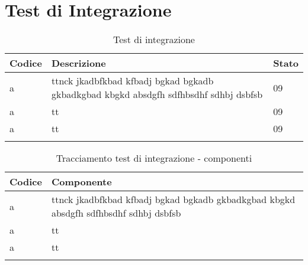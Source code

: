 \documentclass[PianoDiQualifica.tex]{subfiles}
\begin{document}
\chapter{Test di Integrazione}

\begin{longtable}[H]{P{2cm}P{8.5cm}P{3cm}}
	\color{CHeaderText}\textbf{Codice} & 
	\color{CHeaderText}\textbf{Descrizione} & 
	\color{CHeaderText}\textbf{Stato}\\
	\endhead
	a & ttnck  jkadbfkbad kfbadj bgkad bgkadb gkbadkgbad kbgkd absdgfh sdfhbsdhf sdhbj dsbfsb & 09 \\ 
	a & tt & 09 \\
	a & tt & 09 \\
	\hiderowcolors
	\caption{Test di integrazione}
\end{longtable}

\begin{longtable}[H]{P{2cm}P{11.5cm}}
	\color{CHeaderText}\textbf{Codice} & 
	\color{CHeaderText}\textbf{Componente} \\
	\endhead
	a & ttnck  jkadbfkbad kfbadj bgkad bgkadb gkbadkgbad kbgkd absdgfh sdfhbsdhf sdhbj dsbfsb \\ 
	a & tt  \\
	a & tt  \\
	\hiderowcolors
	\caption{Tracciamento test di integrazione - componenti}
\end{longtable}
\end{document}
